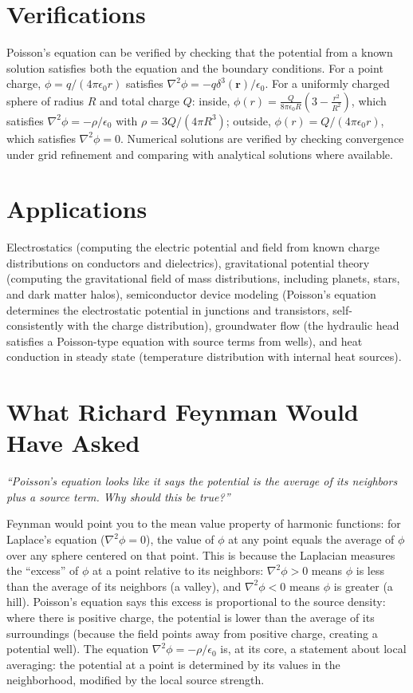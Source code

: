 \section*{Verifications}

Poisson's equation can be verified by checking that the potential from a known solution satisfies both the equation and the boundary conditions. For a point charge, $\phi = q/(4\pi\epsilon_0 r)$ satisfies $\nabla^2\phi = -q\delta^3(\mathbf{r})/\epsilon_0$. For a uniformly charged sphere of radius $R$ and total charge $Q$: inside, $\phi(r) = \frac{Q}{8\pi\epsilon_0 R}\left(3 - \frac{r^2}{R^2}\right)$, which satisfies $\nabla^2\phi = -\rho/\epsilon_0$ with $\rho = 3Q/(4\pi R^3)$; outside, $\phi(r) = Q/(4\pi\epsilon_0 r)$, which satisfies $\nabla^2\phi = 0$. Numerical solutions are verified by checking convergence under grid refinement and comparing with analytical solutions where available.
\section*{Applications}

Electrostatics (computing the electric potential and field from known charge distributions on conductors and dielectrics), gravitational potential theory (computing the gravitational field of mass distributions, including planets, stars, and dark matter halos), semiconductor device modeling (Poisson's equation determines the electrostatic potential in junctions and transistors, self-consistently with the charge distribution), groundwater flow (the hydraulic head satisfies a Poisson-type equation with source terms from wells), and heat conduction in steady state (temperature distribution with internal heat sources).
\section*{What Richard Feynman Would Have Asked}

\textit{``Poisson's equation looks like it says the potential is the average of its neighbors plus a source term. Why should this be true?''}

Feynman would point you to the mean value property of harmonic functions: for Laplace's equation ($\nabla^2\phi = 0$), the value of $\phi$ at any point equals the average of $\phi$ over any sphere centered on that point. This is because the Laplacian measures the ``excess'' of $\phi$ at a point relative to its neighbors: $\nabla^2\phi > 0$ means $\phi$ is less than the average of its neighbors (a valley), and $\nabla^2\phi < 0$ means $\phi$ is greater (a hill). Poisson's equation says this excess is proportional to the source density: where there is positive charge, the potential is lower than the average of its surroundings (because the field points away from positive charge, creating a potential well). The equation $\nabla^2\phi = -\rho/\epsilon_0$ is, at its core, a statement about local averaging: the potential at a point is determined by its values in the neighborhood, modified by the local source strength.

